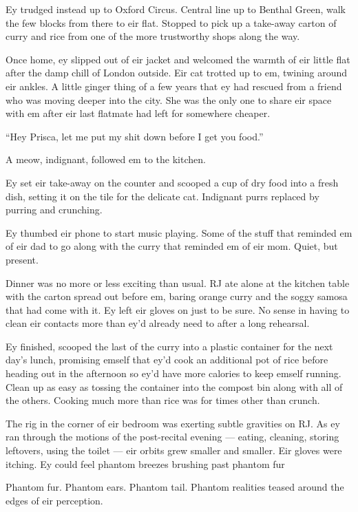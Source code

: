 Ey trudged instead up to Oxford Circus. Central line up to Benthal Green, walk the few blocks from there to eir flat. Stopped to pick up a take-away carton of curry and rice from one of the more trustworthy shops along the way.

Once home, ey slipped out of eir jacket and welcomed the warmth of eir little flat after the damp chill of London outside. Eir cat trotted up to em, twining around eir ankles. A little ginger thing of a few years that ey had rescued from a friend who was moving deeper into the city. She was the only one to share eir space with em after eir last flatmate had left for somewhere cheaper.

``Hey Prisca, let me put my shit down before I get you food.''

A meow, indignant, followed em to the kitchen.

Ey set eir take-away on the counter and scooped a cup of dry food into a fresh dish, setting it on the tile for the delicate cat. Indignant purrs replaced by purring and crunching.

Ey thumbed eir phone to start music playing. Some of the stuff that reminded em of eir dad to go along with the curry that reminded em of eir mom. Quiet, but present.

Dinner was no more or less exciting than usual. RJ ate alone at the kitchen table with the carton spread out before em, baring orange curry and the soggy samosa that had come with it. Ey left eir gloves on just to be sure. No sense in having to clean eir contacts more than ey'd already need to after a long rehearsal.

Ey finished, scooped the last of the curry into a plastic container for the next day's lunch, promising emself that ey'd cook an additional pot of rice before heading out in the afternoon so ey'd have more calories to keep emself running. Clean up as easy as tossing the container into the compost bin along with all of the others. Cooking much more than rice was for times other than crunch.

The rig in the corner of eir bedroom was exerting subtle gravities on RJ. As ey ran through the motions of the post-recital evening — eating, cleaning, storing leftovers, using the toilet — eir orbits grew smaller and smaller. Eir gloves were itching. Ey could feel phantom breezes brushing past phantom fur

Phantom fur. Phantom ears. Phantom tail. Phantom realities teased around the edges of eir perception.

